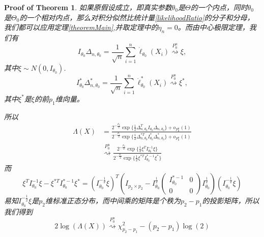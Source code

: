 \documentclass[review]{elsarticle}
\newtheorem{proofOfTheorem}{Proof of Theorem}
\begin{document}


\begin{proofOfTheorem}
    如果原假设成立，即真实参数$\theta_0$是$\Theta$的一个内点，同时$\theta_0$是$\Theta_0$的一个相对内点，那么对积分似然比统计量\eqref{likelihoodRatio}的分子和分母，我们都可以应用定理\ref{theoremMain},并取定理中的$\eta_n=0$。而由中心极限定理，我们有
\begin{equation}
    I_{\theta_0}\Delta_{n,\theta_0}=\frac{1}{\sqrt{n}}\sum^n_{i=1}\dot{\ell}_{\theta_0}(X_i)\overset{P_0^n}{\rightsquigarrow }\xi, 
\end{equation}
其中$\xi\sim N(0,I_{\theta_0})$.
\begin{equation}
    I^*_{\theta_0}\Delta^*_{n,\theta_0}=\frac{1}{\sqrt{n}}\sum^n_{i=1}\dot{\ell}^*_{\theta_0}(X_i)\overset{P_0^n}{\rightsquigarrow} \xi^*, 
\end{equation}
其中$\xi^*$是$\xi$的前$p_1$维向量。

所以
\begin{equation}\label{equationNull}
    \begin{aligned} 
        \Lambda(X)&=
        \frac{
            2^{-\frac{p_2}{2}}\exp\{\frac{1}{2}\Delta_{n,\theta_0}^TI_{\theta_0}\Delta_{n,\theta_0}\}+o_{P_0^n}(1)
        }{
            2^{-\frac{p_1}{2}}\exp\{\frac{1}{2}\Delta_{n,\theta_0}^{*T}I^*_{\theta_0}\Delta^*_{n,\theta_0}\}+o_{P_0^n}(1)
        }
        \\
        &\overset{P_{0}^n}{\rightsquigarrow }
        \frac{
            2^{-\frac{p_2}{2}}\exp\{\frac{1}{2}\xi^TI^{-1}_{\theta_0}\xi\}
        }{
            2^{-\frac{p_1}{2}}\exp\{\frac{1}{2}\xi^{*T}I^{*-1}_{\theta_0}\xi^*\}
        }
    \end{aligned}
\end{equation}
而
\begin{equation}\label{equationXi}
    \xi^TI^{-1}_{\theta_0}\xi -\xi^{*T}I^{*-1}_{\theta_0}\xi^*
    =(I_{\theta_0}^{-\frac{1}{2}}\xi)^T(
        I_{p_{2}\times p_{2}}-
        I_{\theta_0}^{\frac{1}{2}}
        \left(\begin{matrix} 
                I^{*-1}_{\theta_0}&0\\
                0&0
        \end{matrix}\right)
        I_{\theta_0}^{\frac{1}{2}}
    )(I_{\theta_0}^{-\frac{1}{2}}\xi)
\end{equation}
易知$I_{\theta_0}^{-\frac{1}{2}}\xi$是$p_2$维标准正态分布，而中间乘的矩阵是个秩为$p_2-p_1$的投影矩阵，所以我们得到
\begin{equation}
    2\log(\Lambda(X))\overset{P_0^n}{\rightsquigarrow} \chi^2_{p_2-p_1}-(p_2-p_1)\log(2)
\end{equation}
\end{proofOfTheorem}
\end{document}
